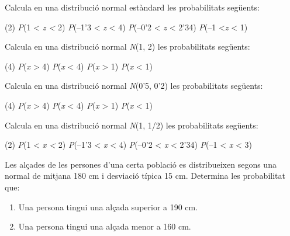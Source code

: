 \begin{mylist}
 
	 
	\item
	Calcula en una distribució normal estàndard les probabilitats
	següents: 
	  	\begin{tasks}(2)
	 	\task \emph{P}(1 \textless{} \emph{z \textless{} }2)
	 	\task \emph{P}(--1'3
	 	\textless{} \emph{z} \textless{} 4)
	 	\task \emph{P}(--0'2 \textless{}
	 	\emph{z} \textless{} 2'34)
	 	\task \emph{P}(--1 \textless{}\emph{z}
	 	\textless{} 1)
	 \end{tasks} 
 
 
	\item
	Calcula en una distribució normal \emph{N}(1, 2) les probabilitats
	següents: 
	  	\begin{tasks}(4)
	 	\task \emph{P}(\emph{x} \textgreater{} 4)
	 	\task \emph{P}(\emph{x}
	 	\textless{} 4)
	 	\task \emph{P}(\emph{x} \textgreater{} 1)
	 	\task \emph{P}(\emph{x} \textless{} 1)
	 \end{tasks} 
 
	\item
	Calcula en una distribució normal \emph{N}(0'5, 0'2) les probabilitats
	següents: 
	  	\begin{tasks}(4)
	 	\task \emph{P}(\emph{x} \textgreater{} 4)
	 	\task \emph{P}(\emph{x}
	 	\textless{} 4)
	 	\task \emph{P}(\emph{x} \textgreater{} 1)
	 	\task \emph{P}(\emph{x} \textless{} 1)
	 \end{tasks} 
 
 
	\item
	Calcula en una distribució normal \emph{N}(1, 1/2) les probabilitats
	següents:
	 	\begin{tasks}(2)
		\task \emph{P}(1 \textless{} \emph{x \textless{} }2)
		\task \emph{P}(--1'3
		\textless{} \emph{x} \textless{} 4)
		\task \emph{P}(--0'2 \textless{}
		\emph{x} \textless{} 2'34)
		\task \emph{P}(--1 \textless{} \emph{x}
		\textless{} 3)
	\end{tasks} 
	
	\item
	Les alçades de les persones d'una certa població es distribueixen
	segons una normal de mitjana 180 cm i desviació típica 15 cm.
	Determina les probabilitat que: 

\begin{enumerate}
\item Una persona tingui una alçada superior a 190 cm.

\item Una persona tingui una alçada menor a 160 cm.


\end{enumerate}
\end{mylist}
